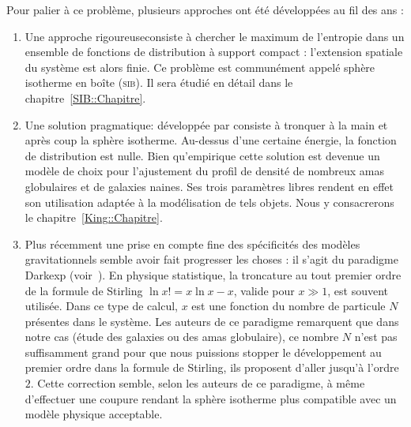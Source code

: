 Pour palier à ce problème, plusieurs approches ont été développées au fil des ans :

\begin{enumerate}
	\item Une approche \og{}rigoureuse\fg consiste à chercher le maximum de l'entropie dans un ensemble de fonctions de distribution à support compact :
		l'extension spatiale du système est alors finie. Ce problème est communément appelé sphère
		isotherme en boîte (\textsc{sib}). Il sera étudié en détail dans le chapitre~\ref{SIB::Chapitre}.
		
	\item Une solution \og{}pragmatique\fg: développée par \cite{King-1966AJ} consiste à tronquer à la main
		et après coup la sphère isotherme. Au-dessus d'une certaine énergie, la fonction de
		distribution est nulle. Bien qu'empirique cette solution est devenue un modèle de choix pour
		l'ajustement du profil de densité de nombreux amas globulaires et de galaxies naines. Ses trois
		paramètres libres rendent en effet son utilisation adaptée à la modélisation de tels objets.
		Nous y consacrerons le chapitre~\ref{King::Chapitre}.
	
	\item Plus récemment une prise en compte fine des spécificités des modèles gravitationnels semble avoir fait progresser les choses :
		il s'agit du paradigme Darkexp (voir~\citet{2010ApJ...722..851H}). En physique statistique, la troncature au tout premier ordre de la
		formule de Stirling $\ln x! = x\ln x
		-x$, valide pour $x\gg1$, est souvent utilisée. Dans ce type de calcul, $x$ est une fonction du nombre de particule $N$
		présentes dans le système. Les auteurs de ce paradigme remarquent que dans notre cas (étude des galaxies ou des amas
		globulaire), ce nombre $N$ n'est pas suffisamment grand pour que nous puissions stopper le développement au premier ordre dans la
		formule de Stirling, ils proposent d'aller jusqu'à l'ordre $2$. Cette
		correction semble, selon les auteurs de ce paradigme, à même d'effectuer une coupure rendant la sphère isotherme plus
		compatible avec un modèle physique acceptable.

\end{enumerate}
